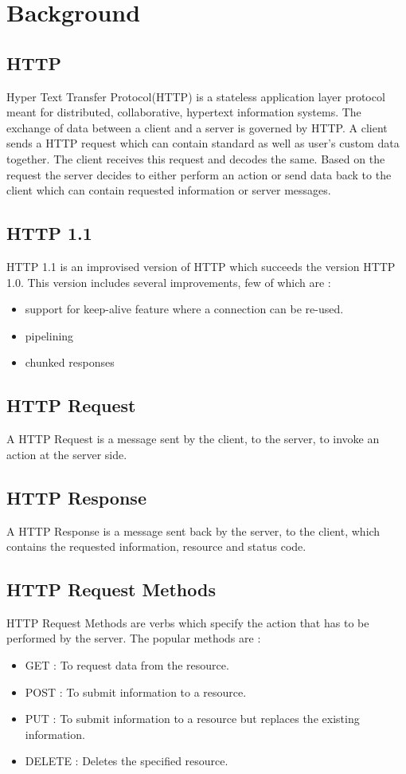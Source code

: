 \chapter{Background}
\section{HTTP} 
Hyper Text Transfer Protocol(HTTP) \cite{b1} is a stateless application layer protocol meant for distributed, collaborative, hypertext information systems. The exchange of data between a client and a server is governed by HTTP. A client sends a HTTP request which can contain standard as well as user's custom data together. The client receives this request and decodes the same. Based on the request the server decides to either perform an action or send data back to the client which can contain requested information or server messages.  

\section{HTTP 1.1}
HTTP 1.1 \cite{b1} is an improvised version of HTTP which succeeds the version HTTP 1.0. This version includes several improvements, few of which are :
\begin{itemize}
	\item support for keep-alive feature where a connection can be re-used.
	\item pipelining
	\item chunked responses
\end{itemize} 

\section{HTTP Request}
A HTTP Request \cite{b7} is a message sent by the client, to the server, to invoke an action at the server side.

\section{HTTP Response}
A HTTP Response \cite{b7} is a message sent back by the server, to the client, which contains the requested information, resource and status code. 

\section{HTTP Request Methods}
HTTP Request Methods \cite{b8} are verbs which specify the action that has to be performed by the server. The popular methods are :
\begin{itemize}
	\item GET : To request data from the resource.
	\item POST : To submit information to a resource. 
	\item PUT : To submit information to a resource but replaces the existing information. 
	\item DELETE : Deletes the specified resource. 
\end{itemize}


